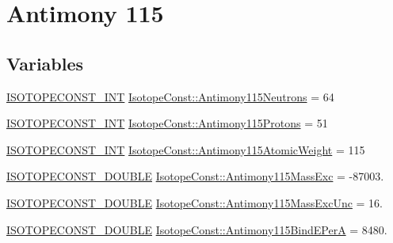 \hypertarget{group___isotope_const-_antimony-_sb115}{}\section{Antimony 115}
\label{group___isotope_const-_antimony-_sb115}
\subsection*{Variables}
\begin{DoxyCompactItemize}
\item 
\mbox{\hyperlink{group___isotope_const-_macros_ga5f18360b3e99483a35c32d789e62621c}{I\+S\+O\+T\+O\+P\+E\+C\+O\+N\+S\+T\+\_\+\+I\+NT}} \mbox{\hyperlink{group___isotope_const-_antimony-_sb115_ga30a8bb4c8f444c9dbd14e88af7c33ae4}{Isotope\+Const\+::\+Antimony115\+Neutrons}} = 64
\item 
\mbox{\hyperlink{group___isotope_const-_macros_ga5f18360b3e99483a35c32d789e62621c}{I\+S\+O\+T\+O\+P\+E\+C\+O\+N\+S\+T\+\_\+\+I\+NT}} \mbox{\hyperlink{group___isotope_const-_antimony-_sb115_gab7a995eeae3952040d33024cf5dc11af}{Isotope\+Const\+::\+Antimony115\+Protons}} = 51
\item 
\mbox{\hyperlink{group___isotope_const-_macros_ga5f18360b3e99483a35c32d789e62621c}{I\+S\+O\+T\+O\+P\+E\+C\+O\+N\+S\+T\+\_\+\+I\+NT}} \mbox{\hyperlink{group___isotope_const-_antimony-_sb115_ga8e1ef0e91c2b511449362bb3eda4bdbb}{Isotope\+Const\+::\+Antimony115\+Atomic\+Weight}} = 115
\item 
\mbox{\hyperlink{group___isotope_const-_macros_ga8f45a7272ce02c0b4c65c44636ed719a}{I\+S\+O\+T\+O\+P\+E\+C\+O\+N\+S\+T\+\_\+\+D\+O\+U\+B\+LE}} \mbox{\hyperlink{group___isotope_const-_antimony-_sb115_gac3ce5a2aaf6400566ee85d3c1f58217e}{Isotope\+Const\+::\+Antimony115\+Mass\+Exc}} = -\/87003.
\item 
\mbox{\hyperlink{group___isotope_const-_macros_ga8f45a7272ce02c0b4c65c44636ed719a}{I\+S\+O\+T\+O\+P\+E\+C\+O\+N\+S\+T\+\_\+\+D\+O\+U\+B\+LE}} \mbox{\hyperlink{group___isotope_const-_antimony-_sb115_ga72aeb290e0d6007f136e465d65ca4c38}{Isotope\+Const\+::\+Antimony115\+Mass\+Exc\+Unc}} = 16.
\item 
\mbox{\hyperlink{group___isotope_const-_macros_ga8f45a7272ce02c0b4c65c44636ed719a}{I\+S\+O\+T\+O\+P\+E\+C\+O\+N\+S\+T\+\_\+\+D\+O\+U\+B\+LE}} \mbox{\hyperlink{group___isotope_const-_antimony-_sb115_ga0f7adec947afa76d1ef101bbf4736b58}{Isotope\+Const\+::\+Antimony115\+Bind\+E\+PerA}} = 8480.
\item 

\end{DoxyCompactItemize}
